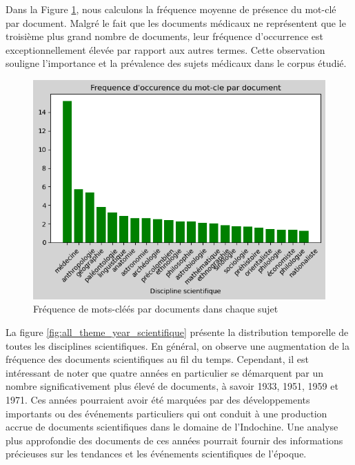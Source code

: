 
Dans la Figure \ref{fig:theme_freq_per_doc}, nous calculons la fréquence moyenne de présence du mot-clé par document. Malgré le fait que les documents médicaux ne représentent que le troisième plus grand nombre de documents, leur fréquence d'occurrence est exceptionnellement élevée par rapport aux autres termes. Cette observation souligne l'importance et la prévalence des sujets médicaux dans le corpus étudié.

\begin{figure} [H]%
    \centering
    \includegraphics[width=14cm]{img/theme_freq_per_doc.png}
    \caption{Fréquence de mots-cléés par documents dans chaque sujet}
    \label{fig:theme_freq_per_doc}
\end{figure}

La figure \ref{fig:all_theme_year_scientifique} présente la distribution temporelle de toutes les disciplines scientifiques. En général, on observe une augmentation de la fréquence des documents scientifiques au fil du temps. Cependant, il est intéressant de noter que quatre années en particulier se démarquent par un nombre significativement plus élevé de documents, à savoir 1933, 1951, 1959 et 1971. Ces années pourraient avoir été marquées par des développements importants ou des événements particuliers qui ont conduit à une production accrue de documents scientifiques dans le domaine de l'Indochine. Une analyse plus approfondie des documents de ces années pourrait fournir des informations précieuses sur les tendances et les événements scientifiques de l'époque.

